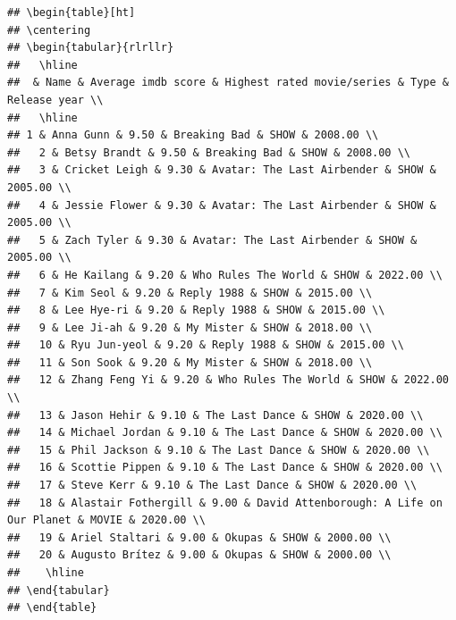 \documentclass[11pt,preprint, authoryear]{elsarticle}
\let\origtable\table
\let\endorigtable\endtable
\renewenvironment{table}[1][2] {
    \expandafter\origtable\expandafter[H]
} {
    \endorigtable
}
\numberwithin{equation}{section}
\numberwithin{figure}{section}
\numberwithin{table}{section}
\begin{document}
\begin{verbatim}
## \begin{table}[ht]
## \centering
## \begin{tabular}{rlrllr}
##   \hline
##  & Name & Average imdb score & Highest rated movie/series & Type & Release year \\ 
##   \hline
## 1 & Anna Gunn & 9.50 & Breaking Bad & SHOW & 2008.00 \\ 
##   2 & Betsy Brandt & 9.50 & Breaking Bad & SHOW & 2008.00 \\ 
##   3 & Cricket Leigh & 9.30 & Avatar: The Last Airbender & SHOW & 2005.00 \\ 
##   4 & Jessie Flower & 9.30 & Avatar: The Last Airbender & SHOW & 2005.00 \\ 
##   5 & Zach Tyler & 9.30 & Avatar: The Last Airbender & SHOW & 2005.00 \\ 
##   6 & He Kailang & 9.20 & Who Rules The World & SHOW & 2022.00 \\ 
##   7 & Kim Seol & 9.20 & Reply 1988 & SHOW & 2015.00 \\ 
##   8 & Lee Hye-ri & 9.20 & Reply 1988 & SHOW & 2015.00 \\ 
##   9 & Lee Ji-ah & 9.20 & My Mister & SHOW & 2018.00 \\ 
##   10 & Ryu Jun-yeol & 9.20 & Reply 1988 & SHOW & 2015.00 \\ 
##   11 & Son Sook & 9.20 & My Mister & SHOW & 2018.00 \\ 
##   12 & Zhang Feng Yi & 9.20 & Who Rules The World & SHOW & 2022.00 \\ 
##   13 & Jason Hehir & 9.10 & The Last Dance & SHOW & 2020.00 \\ 
##   14 & Michael Jordan & 9.10 & The Last Dance & SHOW & 2020.00 \\ 
##   15 & Phil Jackson & 9.10 & The Last Dance & SHOW & 2020.00 \\ 
##   16 & Scottie Pippen & 9.10 & The Last Dance & SHOW & 2020.00 \\ 
##   17 & Steve Kerr & 9.10 & The Last Dance & SHOW & 2020.00 \\ 
##   18 & Alastair Fothergill & 9.00 & David Attenborough: A Life on Our Planet & MOVIE & 2020.00 \\ 
##   19 & Ariel Staltari & 9.00 & Okupas & SHOW & 2000.00 \\ 
##   20 & Augusto Brítez & 9.00 & Okupas & SHOW & 2000.00 \\ 
##    \hline
## \end{tabular}
## \end{table}
\end{verbatim}


\end{document}
